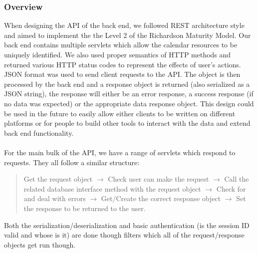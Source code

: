 \documentclass[10pt,a4paper]{article}
\begin{document}
\subsubsection{Overview}
When designing the API of the back end, we followed REST architecture style and 
aimed to implement the the Level 2 of the Richardson Maturity Model. Our back 
end contains multiple servlets which allow the calendar resources to be uniquely 
identified. We also used proper semantics of HTTP methods and returned various 
HTTP status codes to represent the effects of user's actions. JSON format was 
used to send client requests to the API. The object is then processed by the 
back end and a response object is returned (also serialized as a JSON string), 
the response will either be an error response, a success response (if no data 
was expected) or the appropriate data response object. This design could be used 
in the future to easily allow either clients to be written on different 
platforms or for people to build other tools to interact with the data and 
extend back end functionality. 
\\
\\
\noindent For the main bulk of the API, we have a range of servlets which 
respond to requests. They all follow a similar structure:
\begin{quote}
\centering
Get the request object $\rightarrow$ Check user can make the request 
$\rightarrow$ Call the related database interface method with the request object 
$\rightarrow$ Check for and deal with errors $\rightarrow$ Get/Create the 
correct response object $\rightarrow$ Set the response to be returned to the 
user.
\end{quote}
Both the serialization/deserialization and basic authentication (is the session 
ID valid and whose is it) are done though filters which all of the 
request/response objects get run though.
\\
\\
\end{document}
